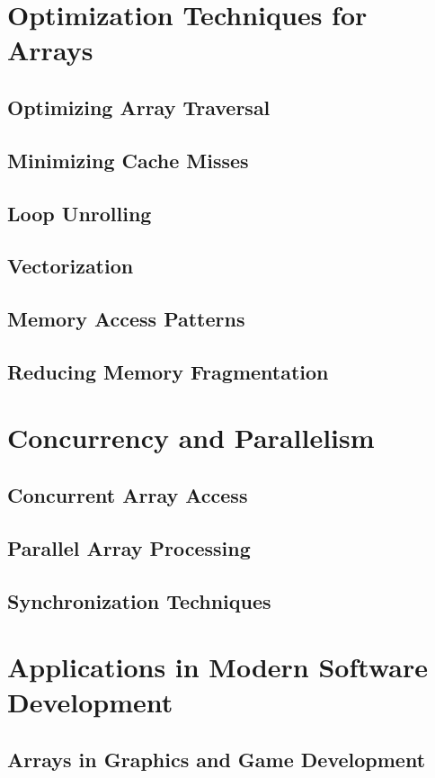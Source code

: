 \documentclass[12pt, oneside]{book}
\begin{document}
	\chapter{Optimization Techniques for Arrays}
	\section{Optimizing Array Traversal}
	\section{Minimizing Cache Misses}
	\section{Loop Unrolling}
	\section{Vectorization}
	\section{Memory Access Patterns}
	\section{Reducing Memory Fragmentation}
	
	\chapter{Concurrency and Parallelism}
	\section{Concurrent Array Access}
	\section{Parallel Array Processing}
	\section{Synchronization Techniques}
	
	\chapter{Applications in Modern Software Development}
	\section{Arrays in Graphics and Game Development}
\end{document}
